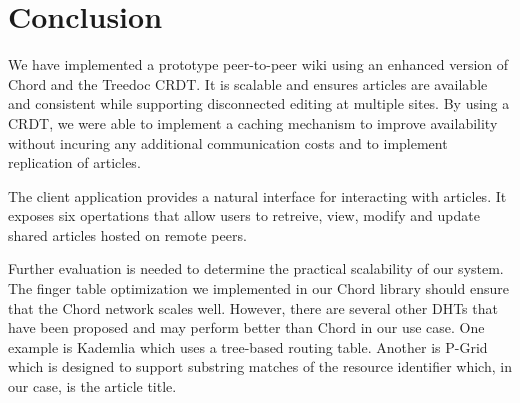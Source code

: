 \documentclass[twocolumn]{article}
\begin{document}
\section{Conclusion}
We have implemented a prototype peer-to-peer wiki using an enhanced version of Chord and the Treedoc CRDT. It is scalable and ensures articles are available and consistent while supporting disconnected editing at multiple sites. By using a CRDT, we were able to implement a caching mechanism to improve availability without incuring any additional communication costs and to implement replication of articles.

The client application provides a natural interface for interacting with articles. It exposes six opertations that allow users to retreive, view, modify and update shared articles hosted on remote peers.

Further evaluation is needed to determine the practical scalability of our system. The finger table optimization we implemented in our Chord library should ensure that the Chord network scales well. However, there are several other DHTs that have been proposed and may perform better than Chord in our use case. One example is Kademlia \cite{kademlia} which uses a tree-based routing table. Another is P-Grid \cite{pgrid} which is designed to support substring matches of the resource identifier which, in our case, is the article title.



\end{document}
